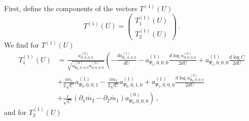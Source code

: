 	First, define the components of the vectors $T^{(1)}(U)$ 
	\begin{equation}
	T^{(1)}(U)  = \begin{pmatrix}
	T_{1}^{(1)}(U)  \\ T_{2}^{(1)}(U) 
	\end{pmatrix}  \, . 
	\end{equation}
	We find for $T^{(1)}(U)$
	\begin{equation}
	\begin{aligned}
	T_{1}^{(1)}(U) &= \frac{a^{(0)}_{S,0,0,0}}{\sqrt{a^{(0)}_{\Psi_0,0,0,0} a^{(0)}_{S,0,0,0}}} \left(
        -\frac{da^{(1)}_{\Psi_1,0,0,0}}{dU}   -  a^{(1)}_{\Psi_1,0,0,0} \frac{d \log a^{(0)}_{S,0,0,0}}{2
    dU}+a^{(1)}_{\Psi_1,0,0,0} \frac{d\log C}{2 dU} \right. \\ & \left. +\frac{i \overline{m}_{1} }{2 \sqrt{C}}
a^{(1)}_{\Psi_0,0,0,1}  -\frac{i \overline{m}_{2}}{2 \sqrt{C}}
a^{(1)}_{\Psi_0,0,1,0}+a^{(1)}_{\Psi_1,0,0,0}\frac{d \log a^{(0)}_{\Psi_0,0,0,0}}{2 dU} \right. \\
                                                               & \left. +\frac{i}{\sqrt{C}} (\partial_{1}\overline{m}_{2}-\partial_{2}\overline{m}_{1})a^{(0)}_{\Psi_0,0,0,0} \right)  \, ,
	\end{aligned}
	\end{equation}
	and for $T_{2}^{(1)}(U)$
